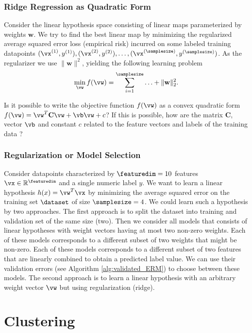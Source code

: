 \documentclass[12pt]{report}
\newcommand{\featurelen}{\featuredim}
\begin{document}
\subsection{Ridge Regression as Quadratic Form} 
\label{ex_2_0}
Consider the linear hypothesis space consisting of linear maps parameterized by 
weights $\mathbf{w}$. We try to find the best linear map by minimizing the regularized average 
squared error loss (empirical risk) incurred on some labeled training datapoints 
$(\vx^{(1)},y^{(1)}),(\vx^{(2)},y^{(2)}),\ldots,(\vx^{(\samplesize)},y^{(\samplesize)})$. 
As the regularizer we use $\| \mathbf{w} \|^{2}$, yielding the following learning problem 
$$ \min_{\vw} f(\vw) = \sum_{i=1}^{\samplesize}\ldots + \| \mathbf{w} \|^{2}_{2}.$$

Is it possible to write the objective function $f(\vw)$ as a convex quadratic form 
$f(\vw) = \vw^{T} \mathbf{C} \vw + \vb \vw + c$? If this is possible, how are the 
matrix $\mathbf{C}$, vector $\vb$ and constant $c$ related to the feature vectors 
and labels of the training data ? 

\subsection{Regularization or Model Selection} 
Consider datapoints characterized by $\featurelen=10$ features $\vx \in \mathbb{R}^{\featurelen}$ 
and a single numeric label $y$. We want to learn a linear hypothesis $h(x) = \vw^{T} \vx$ by 
minimizing the average squared error on the training set $\dataset$ of size $\samplesize=4$. 
We could learn such a hypothesis by two approaches. The first approach is to split the dataset 
into training and validation set of the same size (two). Then we consider all models that consists of 
linear hypotheses with weight vectors having at most two non-zero weights. Each of these models 
corresponds to a different subset of two weights that might be non-zero. Each of these models 
corresponds to a different subset of two features that are linearly combined to obtain a predicted label value. 
We can use their validation errors (see Algorithm \ref{alg:validated_ERM}) to choose between these models. 
The second approach is to learn a linear hypothesis with an arbitrary weight vector $\vw$ 
but using regularization (ridge). 



\newpage
\chapter{Clustering} 
\label{ch_Clustering}
\end{document}
